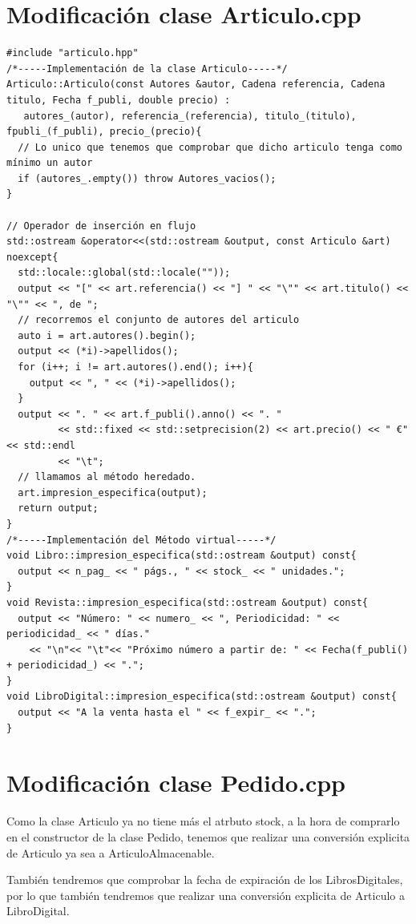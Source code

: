 \section{Modificación clase Articulo.cpp}
\begin{verbatim}
#include "articulo.hpp"
/*-----Implementación de la clase Articulo-----*/
Articulo::Articulo(const Autores &autor, Cadena referencia, Cadena titulo, Fecha f_publi, double precio) :
   autores_(autor), referencia_(referencia), titulo_(titulo), fpubli_(f_publi), precio_(precio){
  // Lo unico que tenemos que comprobar que dicho articulo tenga como mínimo un autor
  if (autores_.empty()) throw Autores_vacios();
}

// Operador de inserción en flujo
std::ostream &operator<<(std::ostream &output, const Articulo &art) noexcept{
  std::locale::global(std::locale(""));
  output << "[" << art.referencia() << "] " << "\"" << art.titulo() << "\"" << ", de ";
  // recorremos el conjunto de autores del articulo
  auto i = art.autores().begin();
  output << (*i)->apellidos();
  for (i++; i != art.autores().end(); i++){
    output << ", " << (*i)->apellidos();
  }
  output << ". " << art.f_publi().anno() << ". "
         << std::fixed << std::setprecision(2) << art.precio() << " €" << std::endl
         << "\t";
  // llamamos al método heredado.
  art.impresion_especifica(output);
  return output;
}
/*-----Implementación del Método virtual-----*/
void Libro::impresion_especifica(std::ostream &output) const{
  output << n_pag_ << " págs., " << stock_ << " unidades.";
}
void Revista::impresion_especifica(std::ostream &output) const{
  output << "Número: " << numero_ << ", Periodicidad: " << periodicidad_ << " días."
    << "\n"<< "\t"<< "Próximo número a partir de: " << Fecha(f_publi() + periodicidad_) << ".";
}
void LibroDigital::impresion_especifica(std::ostream &output) const{
  output << "A la venta hasta el " << f_expir_ << ".";
}
\end{verbatim}
\section{Modificación clase Pedido.cpp}
Como la clase Articulo ya no tiene más el atrbuto stock, a la hora de comprarlo en el constructor de la clase Pedido, tenemos que realizar una conversión explicita de Articulo ya sea a ArticuloAlmacenable.

También tendremos que comprobar la fecha de expiración de los LibrosDigitales, por lo que también tendremos que realizar una conversión explicita de Articulo a LibroDigital.

